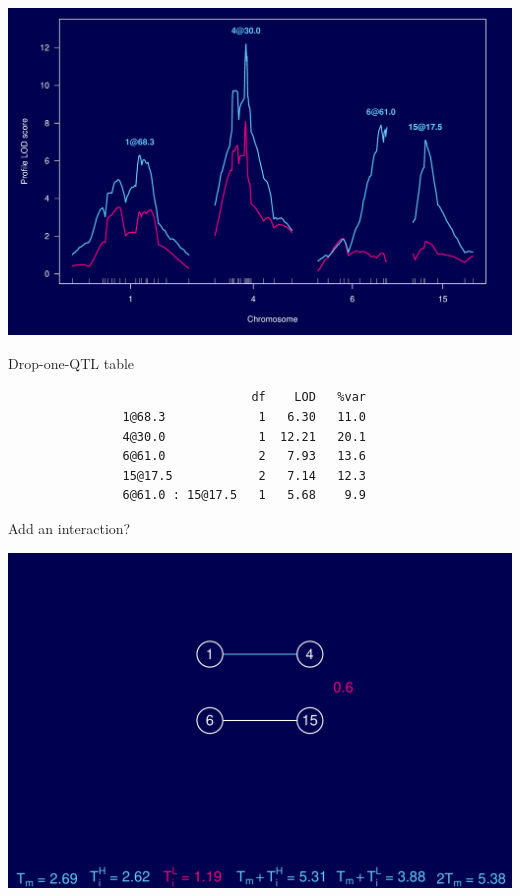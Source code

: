 \documentclass[12pt]{article}
\newcommand{\headsize}{\fontsize{35}{35} \selectfont}
\newcommand{\smallersize}{\fontsize{20}{25} \selectfont}
\begin{document}
\vfill


\centerline{\includegraphics{FigsB/lod_profile.pdf}}


\newpage

\headsize \color{myyellow}
\hfill \begin{minipage}{5.75in}
\centering
Drop-one-QTL table
\end{minipage}


\vspace{40mm}

\color{mywhite} \smallersize

\begin{verbatim}
                                  df    LOD   %var
                1@68.3             1   6.30   11.0
                4@30.0             1  12.21   20.1
                6@61.0             2   7.93   13.6
                15@17.5            2   7.14   12.3
                6@61.0 : 15@17.5   1   5.68    9.9
\end{verbatim}

\newpage


\headsize \color{myyellow}
\hfill \begin{minipage}{5.75in}
\centering
Add an interaction?
\end{minipage}

\vfill


\centerline{\includegraphics{FigsB/hyper_models4.pdf}}
\end{document}
